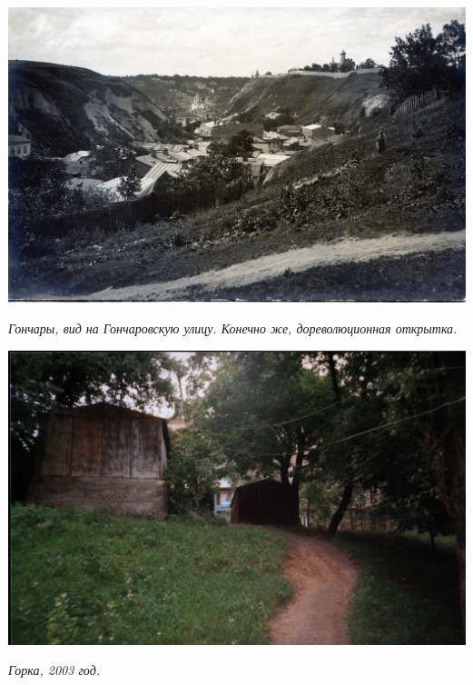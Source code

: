 \begin{center}
\includegraphics[width=\linewidth]{rpix/gonch.jpg}

\textit{Гончары, вид на Гончаровскую улицу. Конечно же, дореволюционная открытка.}
\end{center}


\newpage


\begin{center}
\includegraphics[width=\linewidth]{rpix/gorka.jpg}

\textit{Горка, 2003 год.}
\end{center}

